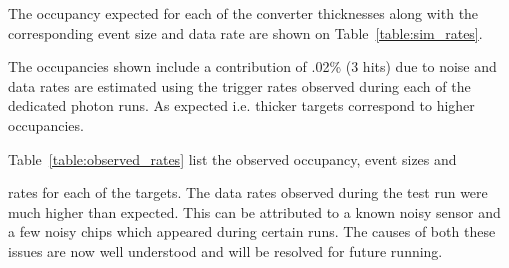 The occupancy expected for each of the converter thicknesses along with the 
corresponding event size and data rate are shown on Table~\ref{table:sim_rates}.
\begin{table}[h]
    \caption{Occupancy, event size and resulting data rate expected for each of the three 
             converter thicknesses used in the test run.}
    \label{table:sim_rates}
\end{table}
The occupancies shown include a contribution of .02\% (3 hits) due to noise and  
data rates are estimated using the trigger rates observed during each
of the dedicated photon runs. As expected i.e. thicker targets correspond to higher 
occupancies. 

Table~\ref{table:observed_rates} list the observed occupancy, event sizes and 
\begin{table}[h]
    \caption{Occupancy, event size and resulting data rate observed for each of the three 
             converter thicknesses used in the test run.}
    \label{table:observed_rates}
\end{table}    
rates for each of the targets.  The data rates observed during the test run were
much higher than expected.  This can be attributed to a known
noisy sensor and a few noisy chips which appeared during certain runs.  The causes
of both these issues are now well understood and will be resolved for future running.


